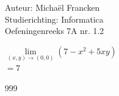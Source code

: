 \documentclass[a4paper]{article}
\begin{document}
\noindent \large Auteur: Michaël Francken \\
\noindent \large Studierichting: Informatica\\
\noindent \large Oefeningenreeks 7A nr. 1.2\\

\medskip

\normalsize

$\lim\limits_{\left(x,y\right)\rightarrow\left(0,0\right)} \left(7-x^2+5xy\right)$\\

$=7$\\

\begin{thebibliography}{999}
\end{thebibliography}
\end{document}
